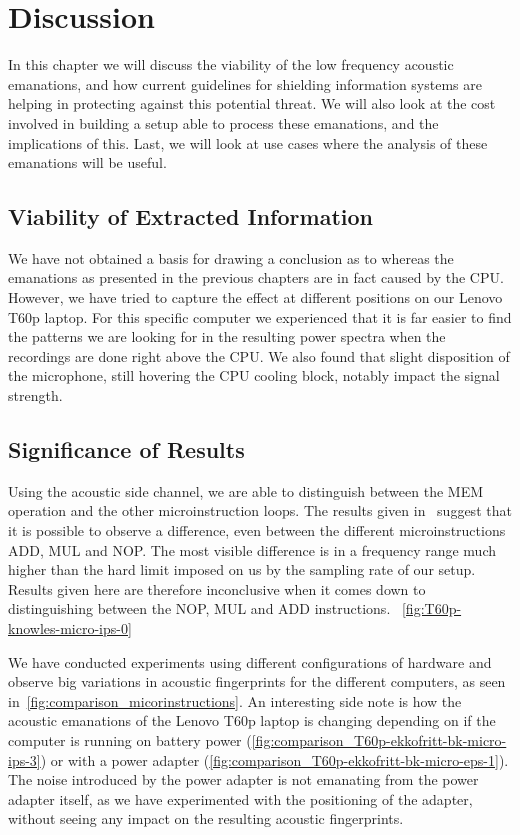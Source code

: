 \chapter{Discussion}\label{chp6:discussion}

In this chapter we will discuss the viability of the low frequency acoustic emanations, and how current guidelines for shielding information systems are helping in protecting against this potential threat.
We will also look at the cost involved in building a setup able to process these emanations, and the implications of this.
Last, we will look at use cases where the analysis of these emanations will be useful.

\section{Viability of Extracted Information}
We have not obtained a basis for drawing a conclusion as to whereas the emanations as presented in the previous chapters are in fact caused by the CPU.
However, we have tried to capture the effect at different positions on our Lenovo T60p laptop. 
For this specific computer we experienced that it is far easier to find the patterns we are looking for in the resulting power spectra when the recordings are done right above the CPU.
We also found that slight disposition of the microphone, still hovering the CPU cooling block, notably impact the signal strength.


\section{Significance of Results}
Using the acoustic side channel, we are able to distinguish between the MEM operation and the other microinstruction loops.
The results given in~\cite[Fig.~2]{DBLP:conf/crypto/GenkinST14} suggest that it is possible to observe a difference, even between the different microinstructions ADD, MUL and NOP. 
The most visible difference is in a frequency range much higher than the hard limit imposed on us by the sampling rate of our setup.
Results given here are therefore inconclusive when it comes down to distinguishing between the NOP, MUL and ADD instructions.
~\autoref{fig:T60p-knowles-micro-ips-0}

We have conducted experiments using different configurations of hardware and observe big variations in acoustic fingerprints for the different computers, as seen in~\autoref{fig:comparison_micorinstructions}.
An interesting side note is how the acoustic emanations of the Lenovo T60p laptop is changing depending on if the computer is running on battery power (\autoref{fig:comparison_T60p-ekkofritt-bk-micro-ips-3}) or with a power adapter (\autoref{fig:comparison_T60p-ekkofritt-bk-micro-eps-1}).
The noise introduced by the power adapter is not emanating from the power adapter itself, as we have experimented with the positioning of the adapter, without seeing any impact on the resulting acoustic fingerprints.


